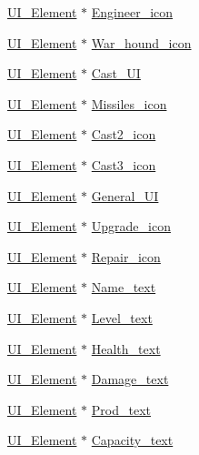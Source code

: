 \begin{DoxyCompactItemize}
\mbox{\hyperlink{class_u_i___element}{U\+I\+\_\+\+Element}} $\ast$ \mbox{\hyperlink{class_player_a1a558107defcb163a605a69750724820}{Engineer\+\_\+icon}}
\item 
\mbox{\hyperlink{class_u_i___element}{U\+I\+\_\+\+Element}} $\ast$ \mbox{\hyperlink{class_player_af9215ac8219ee70227633d81316340ef}{War\+\_\+hound\+\_\+icon}}
\item 
\mbox{\hyperlink{class_u_i___element}{U\+I\+\_\+\+Element}} $\ast$ \mbox{\hyperlink{class_player_a5ecf6a552c44d1f3875b128d0bcbed85}{Cast\+\_\+\+UI}}
\item 
\mbox{\hyperlink{class_u_i___element}{U\+I\+\_\+\+Element}} $\ast$ \mbox{\hyperlink{class_player_a970d1b5e58cd0929e6c97e0104309a5e}{Missiles\+\_\+icon}}
\item 
\mbox{\hyperlink{class_u_i___element}{U\+I\+\_\+\+Element}} $\ast$ \mbox{\hyperlink{class_player_a2ccc373449cae9b0f558b78d7f248dfb}{Cast2\+\_\+icon}}
\item 
\mbox{\hyperlink{class_u_i___element}{U\+I\+\_\+\+Element}} $\ast$ \mbox{\hyperlink{class_player_a8083e83d5de2ef62aeaaddf97123c6a8}{Cast3\+\_\+icon}}
\item 
\mbox{\hyperlink{class_u_i___element}{U\+I\+\_\+\+Element}} $\ast$ \mbox{\hyperlink{class_player_a5a13c3b62fc6b92b1955579fc507dec6}{General\+\_\+\+UI}}
\item 
\mbox{\hyperlink{class_u_i___element}{U\+I\+\_\+\+Element}} $\ast$ \mbox{\hyperlink{class_player_a73d0785a8215260f890693387c4cd9c1}{Upgrade\+\_\+icon}}
\item 
\mbox{\hyperlink{class_u_i___element}{U\+I\+\_\+\+Element}} $\ast$ \mbox{\hyperlink{class_player_a413823bd408e445f96acd34a381638d7}{Repair\+\_\+icon}}
\item 
\mbox{\hyperlink{class_u_i___element}{U\+I\+\_\+\+Element}} $\ast$ \mbox{\hyperlink{class_player_a06dddd6015c09accaa908c4eb24939d4}{Name\+\_\+text}}
\item 
\mbox{\hyperlink{class_u_i___element}{U\+I\+\_\+\+Element}} $\ast$ \mbox{\hyperlink{class_player_a26d8f9665855495d109414d41cd7a5f3}{Level\+\_\+text}}
\item 
\mbox{\hyperlink{class_u_i___element}{U\+I\+\_\+\+Element}} $\ast$ \mbox{\hyperlink{class_player_a18a44a5ab95e107fd5058782bcd25c50}{Health\+\_\+text}}
\item 
\mbox{\hyperlink{class_u_i___element}{U\+I\+\_\+\+Element}} $\ast$ \mbox{\hyperlink{class_player_a564b548b61a08aa2b7462e029b9de2a3}{Damage\+\_\+text}}
\item 
\mbox{\hyperlink{class_u_i___element}{U\+I\+\_\+\+Element}} $\ast$ \mbox{\hyperlink{class_player_a212546bc352d4116065a5014bc1fc9db}{Prod\+\_\+text}}
\item 
\mbox{\hyperlink{class_u_i___element}{U\+I\+\_\+\+Element}} $\ast$ \mbox{\hyperlink{class_player_ad37b79b585d8f13ead82aaa74291b37f}{Capacity\+\_\+text}}
\end{DoxyCompactItemize}


